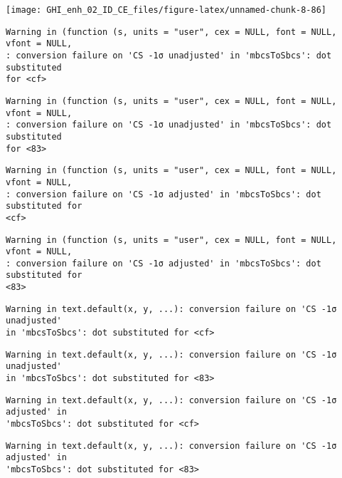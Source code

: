 \documentclass[
  10pt,
  a4paper,oneside]{article}
\begin{document}
\begin{center}\texttt{[image: GHI\_enh\_02\_ID\_CE\_files/figure-latex/unnamed-chunk-8-86]} \end{center}

\begin{verbatim}
Warning in (function (s, units = "user", cex = NULL, font = NULL, vfont = NULL,
: conversion failure on 'CS -1σ unadjusted' in 'mbcsToSbcs': dot substituted
for <cf>
\end{verbatim}

\begin{verbatim}
Warning in (function (s, units = "user", cex = NULL, font = NULL, vfont = NULL,
: conversion failure on 'CS -1σ unadjusted' in 'mbcsToSbcs': dot substituted
for <83>
\end{verbatim}

\begin{verbatim}
Warning in (function (s, units = "user", cex = NULL, font = NULL, vfont = NULL,
: conversion failure on 'CS -1σ adjusted' in 'mbcsToSbcs': dot substituted for
<cf>
\end{verbatim}

\begin{verbatim}
Warning in (function (s, units = "user", cex = NULL, font = NULL, vfont = NULL,
: conversion failure on 'CS -1σ adjusted' in 'mbcsToSbcs': dot substituted for
<83>
\end{verbatim}

\begin{verbatim}
Warning in text.default(x, y, ...): conversion failure on 'CS -1σ unadjusted'
in 'mbcsToSbcs': dot substituted for <cf>
\end{verbatim}

\begin{verbatim}
Warning in text.default(x, y, ...): conversion failure on 'CS -1σ unadjusted'
in 'mbcsToSbcs': dot substituted for <83>
\end{verbatim}

\begin{verbatim}
Warning in text.default(x, y, ...): conversion failure on 'CS -1σ adjusted' in
'mbcsToSbcs': dot substituted for <cf>
\end{verbatim}

\begin{verbatim}
Warning in text.default(x, y, ...): conversion failure on 'CS -1σ adjusted' in
'mbcsToSbcs': dot substituted for <83>
\end{verbatim}
\end{document}
